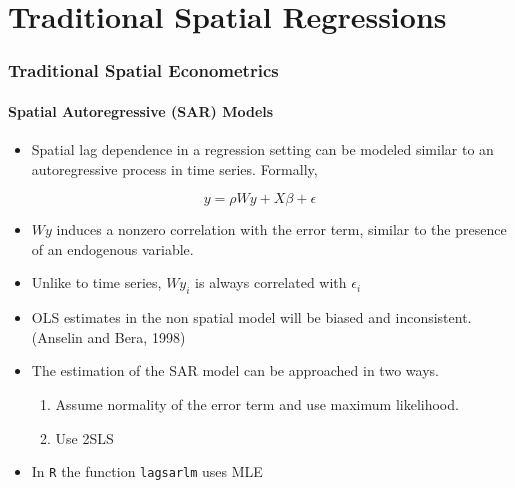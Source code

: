 \documentclass[
  shownotes,
  xcolor={svgnames},
  hyperref={colorlinks,citecolor=DarkBlue,linkcolor=DarkRed,urlcolor=DarkBlue}
  ]{beamer}
\begin{document}
\section{Traditional Spatial Regressions }
\begin{frame}[fragile]
\frametitle{Traditional Spatial Econometrics }
\framesubtitle{Spatial Autoregressive (SAR) Models}

\begin{itemize}
\item Spatial lag dependence in a regression setting can be modeled similar to
an autoregressive process in time series. Formally,
\end{itemize}


\[ y= \rho Wy+ X \beta + \epsilon \]

\begin{itemize}
  \footnotesize
\item \(Wy\) induces a nonzero correlation with the error term, similar to the presence of an endogenous variable.

\item  Unlike to time series, \(Wy_i\) is always correlated with \(\epsilon_i\) 

\item OLS estimates in the non spatial model will be biased and inconsistent. (Anselin and Bera, 1998)

\item The estimation of the SAR model can be approached in two ways.
\begin{enumerate}
  \tiny
  \item Assume normality of the error term and use maximum likelihood.
  \item Use 2SLS
\end{enumerate}
\item In \texttt{R}  the function \texttt{lagsarlm} uses MLE
\end{itemize}

\end{frame}

\end{document}
